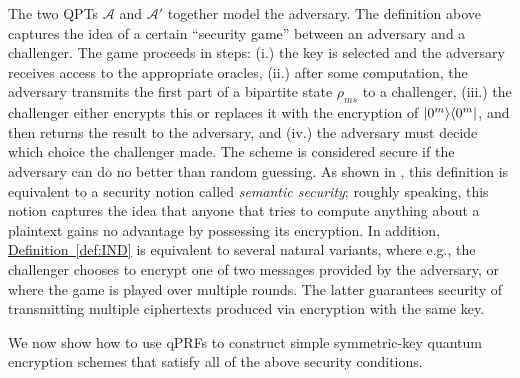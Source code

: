 \documentclass[11pt]{article}
\numberwithin{equation}{section}
\newcommand{\expref}[2]{\texorpdfstring{\hyperref[#2]{#1~\ref{#2}}}{#1~\ref{#2}}}
\newcommand{\algo}{\mathcal}
\begin{document}
The two QPTs $\algo A$ and $\algo A'$ together model the adversary. The definition above captures the idea of a certain ``security game'' between an adversary and a challenger. The game proceeds in steps: (i.) the key is selected and the adversary receives access to the appropriate oracles, (ii.) after some computation, the adversary transmits the first part of a bipartite state $\rho_{ms}$ to a challenger, (iii.) the challenger either encrypts this or replaces it with the encryption of ${\left\vert{0^m}\right\rangle}{\left\langle{0^m}\right\vert}$, and then returns the result to the adversary, and (iv.) the adversary must decide which choice the challenger made. The scheme is considered secure if the adversary can do no better than random guessing. As shown in \cite{ABGFSS15}, this definition is equivalent to a security notion called \emph{semantic security}; roughly speaking, this notion captures the idea that anyone that tries to compute anything about a plaintext gains no advantage by possessing its encryption. In addition, \expref{Definition}{def:IND} is equivalent to several natural variants, where e.g., the challenger chooses to encrypt one of two messages provided by the adversary, or where the game is played over multiple rounds. The latter guarantees security of transmitting multiple ciphertexts produced via encryption with the same key.

We now show how to use qPRFs to construct simple symmetric-key quantum encryption schemes that satisfy all of the above security conditions.
\end{document}
